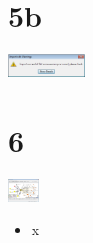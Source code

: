\documentclass[10pt]{beamer}
\begin{document}
\section{5b}
\begin{frame}
	\begin{center}
			\includegraphics[height=0.609cm]{5b.png}
	\end{center}
\end{frame}

\section{6}
\begin{frame}
	\begin{center}
			\includegraphics[height=0.609cm]{6.png}
	\end{center}
	\begin{itemize}
		\item x
	\end{itemize}
\end{frame}
\end{document}
